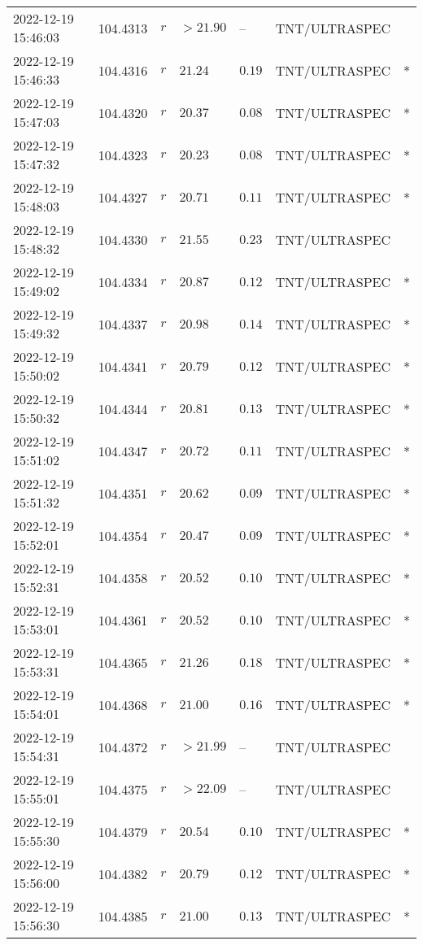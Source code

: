 \documentclass{nature_plusfigure}
\begin{document}
\begin{supplement}
\begin{center}
\begin{longtable}{lllllll}
2022-12-19 15:46:03 & 104.4313 & $r$ & $>21.90$ & -- & TNT/ULTRASPEC &  \\ 
2022-12-19 15:46:33 & 104.4316 & $r$ & $21.24$ & $0.19$ & TNT/ULTRASPEC & * \\ 
2022-12-19 15:47:03 & 104.4320 & $r$ & $20.37$ & $0.08$ & TNT/ULTRASPEC & * \\ 
2022-12-19 15:47:32 & 104.4323 & $r$ & $20.23$ & $0.08$ & TNT/ULTRASPEC & * \\ 
2022-12-19 15:48:03 & 104.4327 & $r$ & $20.71$ & $0.11$ & TNT/ULTRASPEC & * \\ 
2022-12-19 15:48:32 & 104.4330 & $r$ & $21.55$ & $0.23$ & TNT/ULTRASPEC &  \\ 
2022-12-19 15:49:02 & 104.4334 & $r$ & $20.87$ & $0.12$ & TNT/ULTRASPEC & * \\ 
2022-12-19 15:49:32 & 104.4337 & $r$ & $20.98$ & $0.14$ & TNT/ULTRASPEC & * \\ 
2022-12-19 15:50:02 & 104.4341 & $r$ & $20.79$ & $0.12$ & TNT/ULTRASPEC & * \\ 
2022-12-19 15:50:32 & 104.4344 & $r$ & $20.81$ & $0.13$ & TNT/ULTRASPEC & * \\ 
2022-12-19 15:51:02 & 104.4347 & $r$ & $20.72$ & $0.11$ & TNT/ULTRASPEC & * \\ 
2022-12-19 15:51:32 & 104.4351 & $r$ & $20.62$ & $0.09$ & TNT/ULTRASPEC & * \\ 
2022-12-19 15:52:01 & 104.4354 & $r$ & $20.47$ & $0.09$ & TNT/ULTRASPEC & * \\ 
2022-12-19 15:52:31 & 104.4358 & $r$ & $20.52$ & $0.10$ & TNT/ULTRASPEC & * \\ 
2022-12-19 15:53:01 & 104.4361 & $r$ & $20.52$ & $0.10$ & TNT/ULTRASPEC & * \\ 
2022-12-19 15:53:31 & 104.4365 & $r$ & $21.26$ & $0.18$ & TNT/ULTRASPEC & * \\ 
2022-12-19 15:54:01 & 104.4368 & $r$ & $21.00$ & $0.16$ & TNT/ULTRASPEC & * \\ 
2022-12-19 15:54:31 & 104.4372 & $r$ & $>21.99$ & -- & TNT/ULTRASPEC &  \\ 
2022-12-19 15:55:01 & 104.4375 & $r$ & $>22.09$ & -- & TNT/ULTRASPEC &  \\ 
2022-12-19 15:55:30 & 104.4379 & $r$ & $20.54$ & $0.10$ & TNT/ULTRASPEC & * \\ 
2022-12-19 15:56:00 & 104.4382 & $r$ & $20.79$ & $0.12$ & TNT/ULTRASPEC & * \\ 
2022-12-19 15:56:30 & 104.4385 & $r$ & $21.00$ & $0.13$ & TNT/ULTRASPEC & * \\ 

\end{longtable}
\end{center}
\end{supplement}
\end{document}
